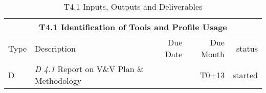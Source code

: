 \begin{table}[h]
\caption{T4.1 Inputs, Outputs and Deliverables} %
\begin{adjustbox}{width=\textwidth}
\begin{tabular}{|l|l|r|r|r|}
\hline
\multicolumn{5}{|c|}{\textbf{T4.1 Identification of Tools and Profile Usage}} 
\\\hline
Type & Description & Due Date & Due Month & status 
\\\hline
 D &\emph{D 4.1} Report on V\&V Plan \& Methodology  & \shortmonthname[7]-2013 & T0+13 & started
\\\hline
\end{tabular}
\end{adjustbox}
\end{table}